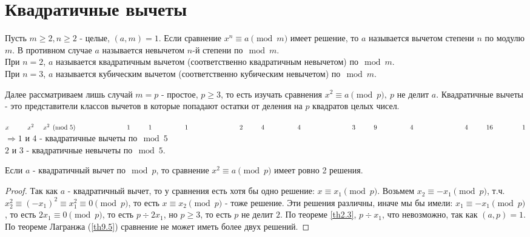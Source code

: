 \section{Квадратичные вычеты}
    \begin{definition}
        Пусть $m\geq 2, n\geq 2$ - целые, $(a,m)=1$. Если сравнение $x^n\equiv a\pmod{m}$ имеет решение, то $a$ называется вычетом степени $n$ по модулю $m$. В противном случае $a$ называется невычетом $n$-й степени по$\mod{m}$.\\
        При $n=2$, $a$ называется квадратичным вычетом (соответственно квадратичным невычетом) по$\mod{m}$.\\
        При $n=3$, $a$ называется кубическим вычетом (соответственно кубическим невычетом) по$\mod{m}$.
    \end{definition} 
        Далее рассматриваем лишь случай $m=p$ - простое, $p\geq 3$, то есть изучать сравнения $x^2\equiv a\pmod{p},\ p$ не делит $a$. Квадратичные вычеты - это представители классов вычетов в которые попадают остатки от деления на $p$ квадратов целых чисел.
    \begin{example}\tab
        $x\tab[1cm] x^2\tab x^2\pmod{5}\\
        \tab[2.8cm]1\tab[1cm] 1\tab[1.8cm] 1\\
        \tab[2.8cm]2\tab[1cm] 4\tab[1.8cm] 4\\
        \tab[2.8cm]3\tab[1cm] 9\tab[1.8cm] 4\\
        \tab[2.8cm]4\tab[1cm] 16\tab[1.6cm] 1\\$
        $\Rightarrow 1$ и $4$ - квадратичные вычеты по$\mod{5}$\\
        $2$ и $3$ - квадратичные невычеты по$\mod{5}$.
    \end{example}
    \begin{theorem}\label{th10.1}
        Если $a$ - квадратичный вычет по$\mod{p}$, то сравнение $x^2\equiv a\pmod{p}$ имеет ровно 2 решения.
    \end{theorem} 
    \begin{proof}
        Так как $a$ - квадратичный вычет, то у сравнения есть хотя бы одно решение: $x\equiv x_1\pmod{p}$. Возьмем $x_2\equiv -x_1\pmod{p}$, т.ч. $x_2^2\equiv (-x_1)^2\equiv x_1^2\equiv 0\pmod{p}$, то есть $x\equiv x_2\pmod{p}$ - тоже решение. Эти решения различны, иначе мы бы имели: $x_1\equiv -x_1\pmod{p}$, то есть $2x_1\equiv 0\pmod{p}$, то есть $p\div 2x_1$, но $p\geq 3$, то есть $p$ не делит $2$. По теореме \ref{th2.3}, $p\div x_1$, что невозможно, так как $(a,p)=1$. По теореме Лагранжа (\ref{th9.5}) сравнение не может иметь более двух решений. 
    \end{proof} 
